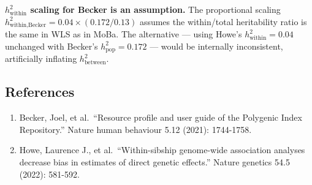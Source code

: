 \documentclass[
]{article}
\providecommand{\tightlist}{%
  \setlength{\itemsep}{0pt}\setlength{\parskip}{0pt}}
\begin{document}
\textbf{\(h^2_\text{within}\) scaling for Becker is an assumption.} The
proportional scaling
\(h^2_{\text{within},\text{Becker}} = 0.04 \times (0.172/0.13)\) assumes
the within/total heritability ratio is the same in WLS as in MoBa. The
alternative --- using Howe's \(h^2_\text{within} = 0.04\) unchanged with
Becker's \(h^2_\text{pop} = 0.172\) --- would be internally
inconsistent, artificially inflating \(h^2_\text{between}\).

\subsection{References}\label{references}

\begin{enumerate}
\def\labelenumi{\Alph{enumi})}
\tightlist
\item
  Becker, Joel, et al.~``Resource profile and user guide of the
  Polygenic Index Repository.'' Nature human behaviour 5.12 (2021):
  1744-1758.
\item
  Howe, Laurence J., et al.~``Within-sibship genome-wide association
  analyses decrease bias in estimates of direct genetic effects.''
  Nature genetics 54.5 (2022): 581-592.
\end{enumerate}
\end{document}
